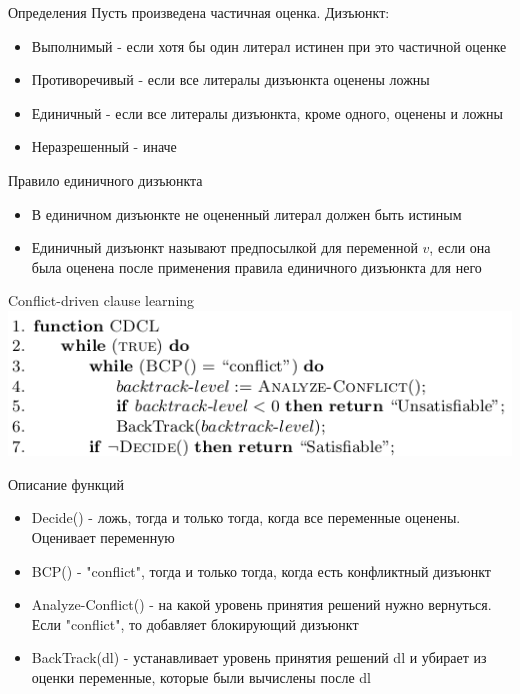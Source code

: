 \documentclass{beamer}
\begin{document}
\begin{frame}{Определения}
Пусть произведена частичная оценка.\newline
Дизъюнкт:
\begin{itemize}
\item Выполнимый - если хотя бы один литерал истинен при это частичной оценке
\item Противоречивый - если все литералы дизъюнкта оценены ложны
\item Единичный - если все литералы дизъюнкта, кроме одного, оценены и ложны
\item Неразрешенный - иначе
\end{itemize}
\end{frame}

\begin{frame}{Правило единичного дизъюнкта}
\begin{itemize}
\item В единичном дизъюнкте не оцененный литерал должен быть истиным
\item Единичный дизъюнкт называют предпосылкой для переменной $v$, если она была оценена после применения правила единичного
дизъюнкта для него
\end{itemize}
\end{frame}

\begin{frame}{Conflict-driven clause learning}
\includegraphics[scale=0.6]{CDCL.png}
\end{frame}

\begin{frame}{Описание функций}
\begin{itemize}
\item Decide() - ложь, тогда и только тогда, когда все переменные оценены. Оценивает переменную
\item BCP() - "conflict", тогда и только тогда, когда есть конфликтный дизъюнкт
\item Analyze-Conflict() - на какой уровень принятия решений нужно вернуться. Если "conflict", то добавляет блокирующий
дизъюнкт
\item BackTrack(dl) - устанавливает уровень принятия решений dl и убирает из оценки переменные, которые были вычислены после dl
\end{itemize}
\end{frame}
\end{document}
